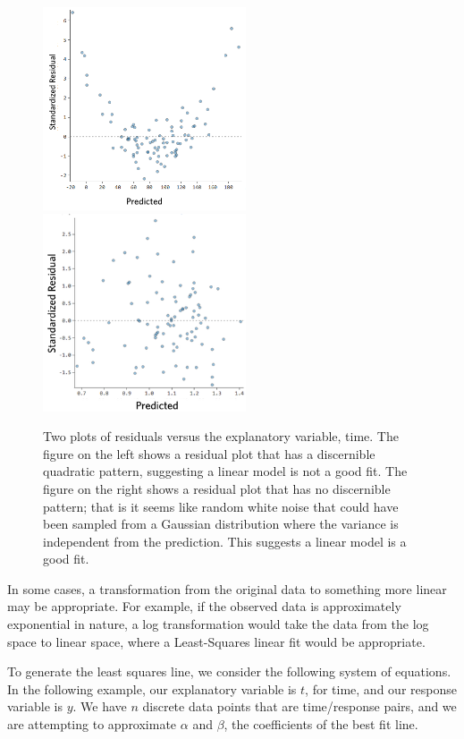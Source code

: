 \begin{figure}
\centering
\includegraphics[width=6cm]{body/background/badresid.png}
\includegraphics[width=6cm]{body/background/goodresid.png}
\caption[Plots of Residuals]{Two plots of residuals versus the explanatory variable, time. The figure on the left shows a residual plot that has a discernible quadratic pattern, suggesting a linear model is not a good fit. The figure on the right shows a residual plot that has no discernible pattern; that is it seems like random white noise that could have been sampled from a Gaussian distribution where the variance is independent from the prediction. This suggests a linear model is a good fit.}
\label{fig:resids}
\end{figure}


In some cases, a transformation from the original data to something more linear may be appropriate. For example, if the observed data is approximately exponential in nature, a log transformation would take the data from the log space to linear space, where a Least-Squares linear fit would be appropriate.

To generate the least squares line, we consider the following system of equations. In the following example, our explanatory variable is $t$, for time, and our response variable is $y$. We have $n$ discrete data points that are time/response pairs, and we are attempting to approximate $\alpha$ and $\beta$, the coefficients of the best fit line. 


